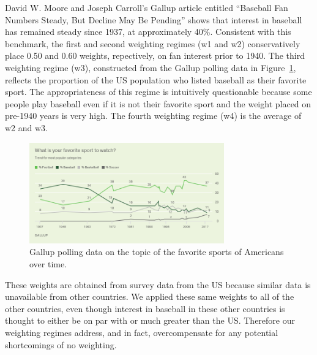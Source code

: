 \documentclass[11pt]{article}\usepackage[]{graphicx}\usepackage[]{color}
\begin{document}
David W. Moore and Joseph Carroll's Gallup article entitled 
``Baseball Fan Numbers Steady, But Decline May Be Pending'' shows that 
interest in baseball has remained steady since 1937, at approximately
40\%.  %
Consistent with this benchmark, the first and second weighting regimes 
(w1 and w2) conservatively place 0.50 and 0.60 weights, repectively, 
on fan interest prior to 1940.  %
The third weighting regime (w3), constructed from the Gallup polling data in 
Figure~\ref{Gallup}, reflects the proportion of the US population who 
listed baseball as their favorite sport.  
The appropriateness of this regime is intuitively questionable because 
some people play baseball even if it is not their favorite sport and the 
weight placed on pre-1940 years is very high.  
The fourth weighting regime (w4) is the average of w2 and w3.  



\begin{figure}
\begin{center}
\includegraphics[width=0.75\textwidth]{Gallupfavoritesport.png}
\end{center}
\caption{Gallup polling data on the topic of the favorite sports 
  of Americans over time.}
\label{Gallup}
\end{figure}


These weights are obtained from survey data from the US because similar data 
is unavailable from other countries.
We applied these same 
weights to all of the other countries, even though interest in baseball in 
these other countries is thought to either be on par with or much greater 
than the US.  Therefore our weighting regimes address, and in fact, 
overcompensate for any potential shortcomings of no weighting.
\end{document}
